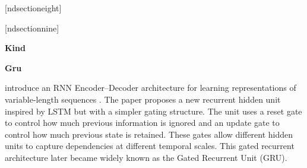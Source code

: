 \documentclass{book}
\providecommand{\ProjectDeepHeading}[2]{%
    \par\medskip\noindent\textbf{#2}\par\smallskip
}
\begin{document}
[ndsectioneight]
\renewcommand{\thendsectionnine}{\thendsectioneight.\arabic{ndsectionnine}}
\newcommand{\ndsectionnine}{%
  \@startsection{ndsectionnine}{9}{\z@}%
    {1.4ex \@plus 1ex \@minus .2ex}%
    {.4ex \@plus .2ex}%
    {\normalfont\small\bfseries}}

[ndsectionnine]
\renewcommand{\thendsectionten}{\thendsectionnine.\arabic{ndsectionten}}
\newcommand{\ndsectionten}{%
  \@startsection{ndsectionten}{10}{\z@}%
    {1.2ex \@plus 1ex \@minus .2ex}%
    {.3ex \@plus .2ex}%
    {\normalfont\small\bfseries}}

\let\l@ndsectionfour\l@subsubsection
\let\l@ndsectionfive\l@subsubsection
\let\l@ndsectionsix\l@subsubsection
\let\l@ndsectionseven\l@subsubsection
\let\l@ndsectioneight\l@subsubsection
\let\l@ndsectionnine\l@subsubsection
\let\l@ndsectionten\l@subsubsection

\newcommand{\DeepSection}[2]{%
  \ifcase#1\relax
    \PackageError{deep_structure}{Section level must be between 1 and 10}{}%
  \or \subsection{#2}%
  \or \subsubsection{#2}%
  \or \paragraph{#2}%
  \or \ndsectionfour{#2}%
  \or \ndsectionfive{#2}%
  \or \ndsectionsix{#2}%
  \or \ndsectionseven{#2}%
  \or \ndsectioneight{#2}%
  \or \ndsectionnine{#2}%
  \or \ndsectionten{#2}%
  \else
    \PackageError{deep_structure}{Section level must be between 1 and 10}{}%
  \fi
}

\let\subsubsubsection\ndsectionfour
\let\subsubsubsubsection\ndsectionfive

\makeatother

\ProjectDeepHeading{4}{Kind}

\ProjectDeepHeading{5}{Gru}


\cite{cho-2014-learning-phrase-representations-using-rnn-encoder-decoder-for-statistical-machine-translation} introduce an RNN Encoder--Decoder architecture for learning representations of variable-length sequences .
   The paper proposes a new recurrent hidden unit inspired by LSTM but with a simpler gating structure. The unit uses a reset gate to control how much previous information is ignored and an update gate to control how much previous state is retained. These gates allow different hidden units to capture dependencies at different temporal scales. This gated recurrent architecture later became widely known as the Gated Recurrent Unit (GRU).
\end{document}
